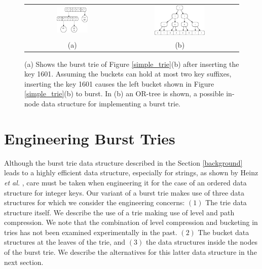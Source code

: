 \documentclass[]{acmtrans2m}
\begin{document}
\begin{figure}%
\center
\begin{tabular}{cc}
\includegraphics[width=0.35\textwidth]{figs/trie2.eps} & \includegraphics[width=0.45\textwidth]{figs/or_tree.eps}\\
(a) & (b)\\
\end{tabular}
\caption{(a) Shows the burst trie of Figure \ref{simple_trie}(b) after inserting the key 1601.
Assuming the buckets can hold at most two key suffixes, inserting the key 1601 causes the left
bucket shown in Figure \ref{simple_trie}(b) to burst. In (b) an OR-tree is shown, a possible
in-node data structure for implementing a burst trie.}
\label{burst_fig}
\end{figure}

\section{Engineering Burst Tries}

Although the burst trie data structure described in the Section \ref{background} leads to a highly efficient
data structure, especially for strings, as shown by Heinz \textit{et al.} \cite{Heinz+02}, 
care must be taken when engineering it for the case of an ordered data structure for integer keys.
Our variant of a burst trie makes use of three data structures for which we consider the engineering concerns:
$(1)$ The trie data structure itself. We describe the use of a trie making use of level and
path compression. We note that the combination of level compression and bucketing in tries has not been examined experimentally
in the past. $(2)$ The bucket data structures at the leaves of the trie, and $(3)$ the data structures 
inside the nodes of the burst trie. We describe the alternatives for this latter data structure in the next section.
\end{document}
